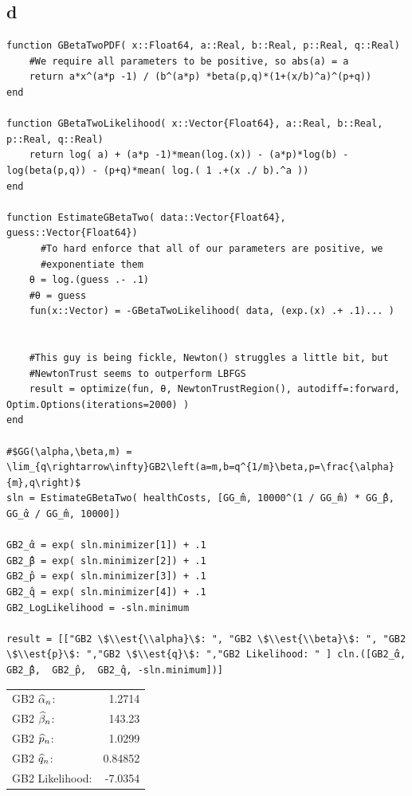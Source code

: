 \documentclass[12pt, letterpaper]{paper}
\begin{document}
\subsection{d}
\label{sec:orgf20253f}
\begin{verbatim}
function GBetaTwoPDF( x::Float64, a::Real, b::Real, p::Real, q::Real)
    #We require all parameters to be positive, so abs(a) = a
    return a*x^(a*p -1) / (b^(a*p) *beta(p,q)*(1+(x/b)^a)^(p+q))
end

function GBetaTwoLikelihood( x::Vector{Float64}, a::Real, b::Real, p::Real, q::Real)
    return log( a) + (a*p -1)*mean(log.(x)) - (a*p)*log(b) - log(beta(p,q)) - (p+q)*mean( log.( 1 .+(x ./ b).^a ))
end

function EstimateGBetaTwo( data::Vector{Float64}, guess::Vector{Float64})
      #To hard enforce that all of our parameters are positive, we
      #exponentiate them
    θ = log.(guess .- .1)
    #θ = guess
    fun(x::Vector) = -GBetaTwoLikelihood( data, (exp.(x) .+ .1)... )


    #This guy is being fickle, Newton() struggles a little bit, but
    #NewtonTrust seems to outperform LBFGS
    result = optimize(fun, θ, NewtonTrustRegion(), autodiff=:forward, Optim.Options(iterations=2000) )
end

#$GG(\alpha,\beta,m) = \lim_{q\rightarrow\infty}GB2\left(a=m,b=q^{1/m}\beta,p=\frac{\alpha}{m},q\right)$
sln = EstimateGBetaTwo( healthCosts, [GG_̂m, 10000^(1 / GG_̂m) * GG_̂β, GG_̂α / GG_̂m, 10000])

GB2_̂α = exp( sln.minimizer[1]) + .1
GB2_̂β = exp( sln.minimizer[2]) + .1
GB2_̂p = exp( sln.minimizer[3]) + .1
GB2_̂q = exp( sln.minimizer[4]) + .1
GB2_LogLikelihood = -sln.minimum

result = [["GB2 \$\\est{\\alpha}\$: ", "GB2 \$\\est{\\beta}\$: ", "GB2 \$\\est{p}\$: ","GB2 \$\\est{q}\$: ","GB2 Likelihood: " ] cln.([GB2_̂α, GB2_̂β,  GB2_̂p,  GB2_̂q, -sln.minimum])]
\end{verbatim}

\begin{center}
\begin{tabular}{lr}
GB2 \(\widehat{ \alpha }_{n}\): & 1.2714\\
GB2 \(\widehat{ \beta }_{n}\): & 143.23\\
GB2 \(\widehat{ p }_{n}\): & 1.0299\\
GB2 \(\widehat{ q }_{n}\): & 0.84852\\
GB2 Likelihood: & -7.0354\\
\end{tabular}
\end{center}
\end{document}
